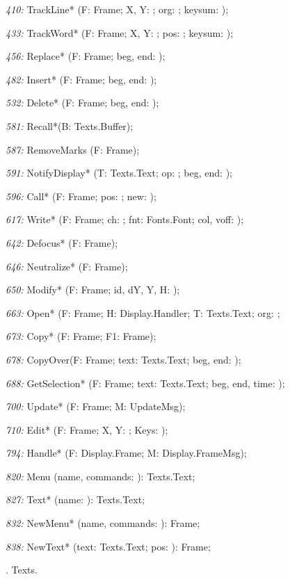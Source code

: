 \item{\it 410:} TrackLine* (F: Frame; X, Y: \INTEGER; \VAR org: \LONGINT; \VAR keysum: \SET);
\item{\it 433:} TrackWord* (F: Frame; X, Y: \INTEGER; \VAR pos: \LONGINT; \VAR keysum: \SET);
\item{\it 456:} Replace* (F: Frame; beg, end: \LONGINT);
\item{\it 482:} Insert* (F: Frame; beg, end: \LONGINT);
\item{\it 532:} Delete* (F: Frame; beg, end: \LONGINT);
\item{\it 581:} Recall*(\VAR B: Texts.Buffer);
\item{\it 587:} RemoveMarks (F: Frame);
\item{\it 591:} NotifyDisplay* (T: Texts.Text; op: \INTEGER; beg, end: \LONGINT);
\item{\it 596:} Call* (F: Frame; pos: \LONGINT; new: \BOOLEAN);
\item{\it 617:} Write* (F: Frame; ch: \CHAR; fnt: Fonts.Font; col, voff: \INTEGER);
\item{\it 642:} Defocus* (F: Frame);
\item{\it 646:} Neutralize* (F: Frame);
\item{\it 650:} Modify* (F: Frame; id, dY, Y, H: \INTEGER);
\item{\it 663:} Open* (F: Frame; H: Display.Handler; T: Texts.Text; org: \LONGINT;
\item{\it 673:} Copy* (F: Frame; \VAR F1: Frame);
\item{\it 678:} CopyOver(F: Frame; text: Texts.Text; beg, end: \LONGINT);
\item{\it 688:} GetSelection* (F: Frame; \VAR text: Texts.Text; \VAR beg, end, time: \LONGINT);
\item{\it 700:} Update* (F: Frame; \VAR M: UpdateMsg);
\item{\it 710:} Edit* (F: Frame; X, Y: \INTEGER; Keys: \SET);
\item{\it 794:} Handle* (F: Display.Frame; \VAR M: Display.FrameMsg);
\item{\it 820:} Menu (name, commands: \ARRAYOF\CHAR): Texts.Text;
\item{\it 827:} Text* (name: \ARRAYOF\CHAR): Texts.Text;
\item{\it 832:} NewMenu* (name, commands: \ARRAYOF\CHAR): Frame;
\item{\it 838:} NewText* (text: Texts.Text; pos: \LONGINT): Frame;

. Texts.

